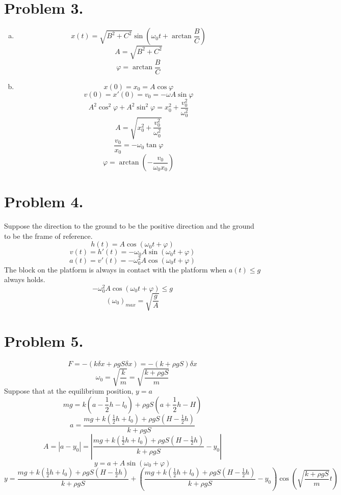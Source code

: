 \documentclass{article}
\begin{document}
\section*{Problem 3.}
	\begin{enumerate}[(a)]
	\item
		$$x(t)=\sqrt{B^2+C^2}\sin\left(\omega_0t+\arctan\frac{B}{C}\right)$$
		$$A=\sqrt{B^2+C^2}$$
		$$\varphi=\arctan\frac{B}{C}$$
	\item
		$$x(0)=x_0=A\cos\varphi$$
		$$v(0)=x'(0)=v_0=-\omega A\sin\varphi$$
		$$A^2\cos^2\varphi+A^2\sin^2\varphi
		=x_0^2+\frac{v_0^2}{\omega_0^2}$$
		$$A=\sqrt{x_0^2+\frac{v_0^2}{\omega_0^2}}$$
		$$\frac{v_0}{x_0}=-\omega_0\tan\varphi$$
		$$\varphi=\arctan\left(-\frac{v_0}{\omega_0x_0}\right)$$
	\end{enumerate}
	
\section*{Problem 4.}
	Suppose the direction to the ground to be the positive direction and the ground to be the frame of reference.
	$$h(t)=A\cos(\omega_0t+\varphi)$$
	$$v(t)=h'(t)=-\omega_0A\sin(\omega_0t+\varphi)$$
	$$a(t)=v'(t)=-\omega_0^2A\cos(\omega_0t+\varphi)$$
	The block on the platform is always in contact with the platform when $a(t)\leqslant g$ always holds.
	$$-\omega_0^2A\cos(\omega_0t+\varphi)\leqslant g$$
	$$(\omega_0)_{max}=\sqrt{\frac{g}{A}}$$
	
\section*{Problem 5.}
	$$F=-(k\delta x+\rho gS\delta x)=-(k+\rho gS)\delta x$$
	$$\omega_0=\sqrt{\frac{k}{m}}=\sqrt{\frac{k+\rho gS}{m}}$$
	Suppose that at the equilibrium position, $y=a$\\
	$$mg=k(a-\frac{1}{2}h-l_0)+\rho gS(a+\frac{1}{2}h-H)$$
	$$a=\frac{mg+k(\frac{1}{2}h+l_0)+\rho gS(H-\frac{1}{2}h)}{k+\rho gS}$$
	$$A=|a-y_0|=\left|\frac{mg+k(\frac{1}{2}h+l_0)+\rho gS(H-\frac{1}{2}h)}{k+\rho gS}-y_0\right|$$
	$$y=a+A\sin(\omega_0+\varphi)$$
	$$y=\frac{mg+k(\frac{1}{2}h+l_0)+\rho gS(H-\frac{1}{2}h)}{k+\rho gS}+
	\left(\frac{mg+k(\frac{1}{2}h+l_0)+\rho gS(H-\frac{1}{2}h)}{k+\rho gS}-y_0\right)
	\cos(\sqrt{\frac{k+\rho gS}{m}}t)$$
\end{document}
